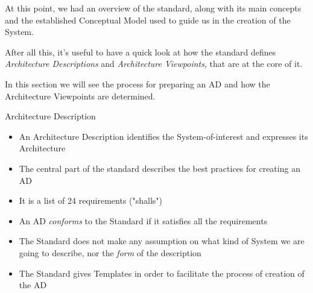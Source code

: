 		
		\begin{frame}
		
		At this point, we had an overview of the standard, along with its main concepts and the established Conceptual Model used to guide us in the creation of the System.
		\newline\newline
		
		After all this, it's useful to have a quick look at how the standard defines \emph{Architecture Descriptions} and \emph{Architecture Viewpoints}, that are at the core of it.\newline\newline
		
		In this section we will see the process for preparing an AD and how the Architecture Viewpoints are determined.
		
		\end{frame}
		
		\begin{frame}
			\begin{block}{Architecture Description}
				\begin{itemize}
				\vspace{0.3cm}
					\item An Architecture Description identifies the System-of-interest and expresses its Architecture
					\vspace{0.3cm}
					\item The central part of the standard describes the best practices for creating an AD
\vspace{0.3cm}				
					\item It is a list of 24 requirements ("shalls")
\vspace{0.3cm}				
					\item An AD \emph{conforms} to the Standard if it satisfies all the requirements
\vspace{0.3cm}					
					\item The Standard does not make any assumption on what kind of System we are going to describe, nor the \emph{form} of the description
					\vspace{0.3cm}
					\item The Standard gives Templates in order to facilitate the process of creation of the AD
					\vspace{0.3cm}
				\end{itemize}
			\end{block}
		\end{frame}				
		
